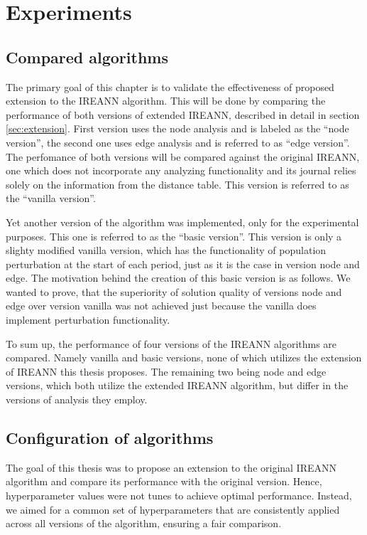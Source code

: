 \documentclass[twoside]{ctuthesis}
\theoremstyle{plain}
\theoremstyle{definition}
\theoremstyle{note}
\begin{document}
\chapter{Experiments}
\label{sec:experiments}

\section{Compared algorithms}
The primary goal of this chapter is to validate the effectiveness of proposed extension to the IREANN algorithm. This will be done by comparing the performance of both versions of extended IREANN, described in detail in section \ref{sec:extension}. First version uses the node analysis and is labeled as the ``node version'', the second one uses edge analysis and is referred to as ``edge version''.
The perfomance of both versions will be compared against the original IREANN, one which does not incorporate any analyzing functionality and its journal relies solely on the information from the distance table. This version is referred to as the ``vanilla version''.

Yet another version of the algorithm was implemented, only for the experimental purposes. This one is referred to as the ``basic version''. This version is only a slighty modified vanilla version, which has the functionality of population perturbation at the start of each period, just as it is the case in version node and edge. The motivation behind the creation of this basic version is as follows. We wanted to prove, that the superiority of solution quality of versions node and edge over version vanilla was not achieved just because the vanilla does implement perturbation functionality.

To sum up, the performance of four versions of the IREANN algorithms are compared. Namely vanilla and basic versions, none of which utilizes the extension of IREANN this thesis proposes. The remaining two being node and edge versions, which both utilize the extended IREANN algorithm, but differ in the versions of analysis they employ.

\section{Configuration of algorithms}

The goal of this thesis was to propose an extension to the original IREANN algorithm and compare its performance with the original version. Hence, hyperparameter values were not tunes to achieve optimal performance. Instead, we aimed for a common set of hyperparameters that are consistently applied across all versions of the algorithm, ensuring a fair comparison. 
\end{document}
